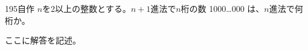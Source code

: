 \begin{prob}{195}{\maru}{自作}
 $n$を2以上の整数とする。$n+1$進法で$n$桁の数 1000\ldots000 は、$n$進法で何桁か。
\end{prob}
ここに解答を記述。